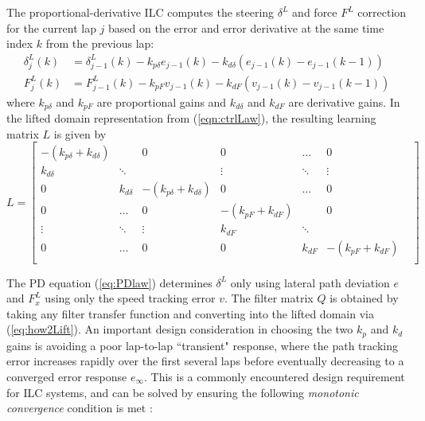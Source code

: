 \documentclass[9pt,shortpaper,twoside,web]{ieeecolor}
\begin{document}
{{{The proportional-derivative ILC computes the steering $\delta^L$ and force $F^L$ correction for the current lap $j$ based on the error and 
error derivative at the same time index $k$ from the previous lap:
\begin{align}
	\label{eq:PDlaw}
	\delta^L_{j}(k) &= \delta^L_{j\!-\!1}(k) - k_{p\delta}e_{j\!-\!1}(k) - k_{d\delta}(e_{j\!-\!1}(k) - e_{j\!-\!1}(k-1))\\
	    F^L_{j}(k) &=  F^L_{j-1}(k) - k_{pF}v_{j\!-\!1}(k) - k_{dF}(v_{j\!-\!1}(k) - v_{j\!-\!1}(k-1))
\end{align}
where $k_{p\delta}$ and $k_{pF}$ are proportional gains and $k_{d\delta}$ and $k_{dF}$ are derivative gains. In the lifted domain representation from (\ref{eqn:ctrlLaw}), the resulting learning matrix $L$ is given by
\begin{equation}
	L = \left[\begin{smallmatrix} 		-(k_{p\delta}+k_{d\delta}) &          &  0                            & 0 & \hdots & 0 \\ 
									   k_{d\delta}                     &  \ddots  &                               & \vdots & \ddots & \vdots\\ 
									   0                       &   k_{d\delta}    &    -(k_{p\delta}+k_{d\delta}) & 0 & \hdots & 0 \\
						               0 & \hdots & 0 & -(k_{pF}+k_{dF}) &          &  0\\
									   \vdots & \ddots & \vdots & k_{dF} &  \ddots  &                               &\\
									   0 & \hdots & 0  & 0 & k_{dF} & -(k_{pF} + k_{dF}) \\			
			\end{smallmatrix}\right]
\end{equation}
 
 The PD equation (\ref{eq:PDlaw}) determines $\delta^L$ only using lateral path deviation $e$ and $F^L_x$ using only the speed tracking error $v$. The filter matrix $Q$ is obtained by taking any filter transfer function and converting into the lifted domain via (\ref{eq:how2Lift}).  An important design consideration in choosing the two $k_p$ and $k_d$ gains is avoiding a poor lap-to-lap ``transient" response, where the path tracking error increases rapidly over the first several laps before
eventually decreasing to a converged error response $e_\infty$. This is a commonly encountered design requirement
for ILC systems, and can be solved by ensuring the following \textit{monotonic convergence} condition is met \cite{bristow}:

}}}
\end{document}
